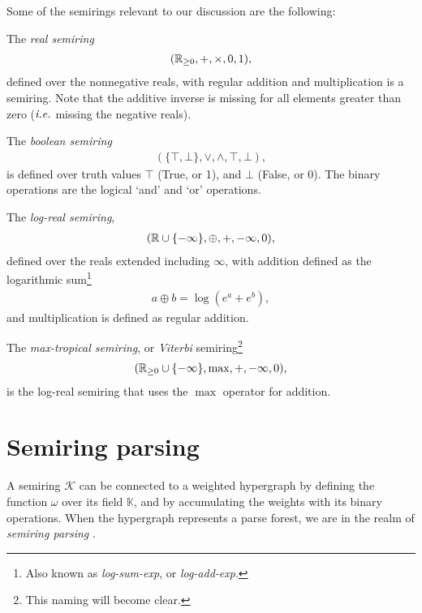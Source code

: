   Some of the semirings relevant to our discussion are the following:
  \begin{example}{}
    The \textit{real semiring}
    \begin{align*}
      ( \mathbb{R}_{\geq 0}, +, \times, 0, 1 ),
    \end{align*}
    defined over the nonnegative reals, with regular addition and multiplication is a semiring. Note that the additive inverse is missing for all elements greater than zero ($\emph{i.e.}$ missing the negative reals).
  \end{example}

  \begin{example}{}
    The \textit{boolean semiring}
    \begin{align*}
      ( \{ \top, \bot \}, \vee, \wedge, \top, \bot  ),
    \end{align*}
    is defined over truth values $\top$ (True, or 1), and $\bot$ (False, or 0). The binary operations are the logical `and' and `or' operations.
  \end{example}

  \begin{example}{}
    The \textit{log-real semiring},
    \begin{align*}
      ( \mathbb{R} \cup \{ - \infty \}, \oplus, +, -\infty, 0 ),
    \end{align*}
    defined over the reals extended including $\infty$, with addition defined as the logarithmic sum\footnote{Also known as \textit{log-sum-exp}, or \textit{log-add-exp}.}
    \begin{align*}
      a \oplus b = \log( e^{a} + e^{b} ),
    \end{align*}
   and multiplication is defined as regular addition.
  \end{example}

  \begin{example}{}
    The \textit{max-tropical semiring}, or \textit{Viterbi} semiring\footnote{This naming will become clear.}
    \begin{align*}
      ( \mathbb{R}_{\geq 0} \cup \{ -\infty \}, \max, +, -\infty, 0 ),
    \end{align*}
    is the log-real semiring that uses the $\max$ operator for addition.
  \end{example}

\section{Semiring parsing}
  A semiring $\mathcal{K}$ can be connected to a weighted hypergraph by defining the function $\omega$ over its field $\mathbb{K}$, and by accumulating the weights with its binary operations. When the hypergraph represents a parse forest, we are in the realm of \textit{semiring parsing} \citep{goodman1999semiring}.

